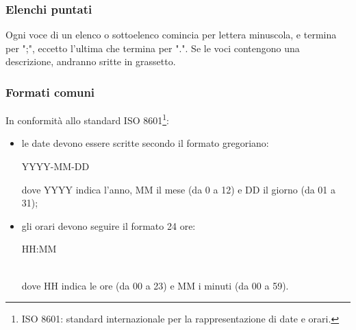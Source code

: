 \subsubsection{Elenchi puntati}
Ogni voce di un elenco o sottoelenco comincia per lettera minuscola, e termina per ";", eccetto l'ultima che termina per ".". 
Se le voci contengono una descrizione, andranno sritte in grassetto.

\subsubsection{Formati comuni}
In conformità allo standard ISO 8601\footnote{ISO 8601: standard internazionale per la rappresentazione di date e orari.}:\begin{itemize}
\item le date devono essere scritte secondo il formato gregoriano: \\
	\centerline{YYYY-MM-DD}
	dove YYYY indica l'anno, MM il mese (da 0 a 12) e DD il giorno (da 01 a 31);
\item gli orari devono seguire il formato 24 ore: \\
	\centerline{HH:MM} \\
	dove HH indica le ore (da 00 a 23) e MM i minuti (da 00 a 59).
\end{itemize} 



